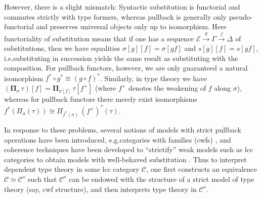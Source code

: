 \documentclass[a4paper]{article}
\theoremstyle{remark}
\theoremstyle{definition}
\begin{document}
However, there is a slight mismatch:
Syntactic substitution is functorial and commutes strictly with type formers, whereas pullback is generally only pseudo-functorial and preserves universal objects only up to isomorphism.
Here functoriality of substitution means that if one has a sequence $\mathcal{E} \xrightarrow{g} \Gamma \xrightarrow{f} \Delta$ of substitutions, then we have equalities $\sigma[g][f] = \sigma[gf]$ and $s[g][f] = s[gf]$, i.e.\@ substituting in succession yields the same result as substituting with the composition.
For pullback functors, however, we are only guaranteed a natural isomorphism $f^* \circ g^* \cong (g \circ f)^*$.
Similarly, in type theory we have $(\mathbf{\Pi}_\sigma \, \tau)[f] = \mathbf{\Pi}_{\sigma[f]} \, \tau[f^+]$ (where $f^+$ denotes the weakening of $f$ along $\sigma$), whereas for pullback functors there merely exist isomorphisms $f^*(\Pi_\sigma(\tau)) \cong \Pi_{f^*(\sigma)} \, (f^+)^*(\tau)$.

In response to these problems, several notions of models with strict pullback operations have been introduced, e.g.\@ categories with families (cwfs) \cite{internal-type-theory}, and coherence techniques have been developed to ``strictify'' weak models such as lcc categories to obtain models with well-behaved substitution \cite{substitution-up-to-isomorphism,on-the-interpretation-of-type-theory-in-lcc-categories,the-local-universes-model}.
Thus to interpret dependent type theory in some lcc category $\mathcal{C}$, one first constructs an equivalence $\mathcal{C} \simeq \mathcal{C}^s$ such that $\mathcal{C}^s$ can be endowed with the structure of a strict model of type theory (say, cwf structure), and then interprets type theory in $\mathcal{C}^s$.
\end{document}
